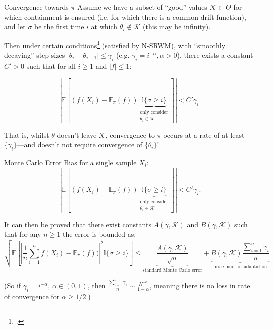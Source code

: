 \documentclass[aspectratio=169]{beamer}
\begin{document}
    



\begin{frame}{Convergence towards $\pi$}
    Assume we have a subset of ``good'' values $\mathcal{K} \subset \Theta$ for which containment is ensured (i.e. for which there is a common drift function), and let $\sigma$ be the first time $i$ at which $\theta_i \notin \mathcal{K}$ (this may be infinity).
    \pause

    Then under certain conditions\footcite{andrieu_ergodicity_2006} (satisfied by N-SRWM), with ``smoothly decaying'' step-sizes $|\theta_i - \theta_{i-1}| \leq \gamma_i$ (e.g. $\gamma_i = i^{-\alpha}, \alpha > 0$), there exists a constant $C' > 0$ such that for all $i \geq 1$ and $|f| \leq 1$:

    $$| \mathbb{E}[(f(X_i) - \mathbb{E}_\pi(f))\underbrace{\mathbb{I}\{\sigma \geq i\}}_{\substack{\text{only consider} \\ \text{$\theta_i \in \mathcal{K}$}}}]| < C' \gamma_i.$$

    \onslide<+-> 
    That is, whilst $\theta$ doesn't leave $\mathcal{K}$, convergence to $\pi$ occurs at a rate of at least $\{\gamma_i\}$---and doesn't not require convergence of $\{\theta_i\}$! 
\end{frame}

\begin{frame}{Monte Carlo Error}
    Bias for a single sample $X_i$:
    $$| \mathbb{E}[(f(X_i) - \mathbb{E}_\pi(f))\underbrace{\mathbb{I}\{\sigma \geq i\}}_{\substack{\text{only consider} \\ \text{$\theta_i \in \mathcal{K}$}}}]| < C' \gamma_i.$$
    
    \pause 

    It can then be proved that there exist constants $A(\gamma, \mathcal{K})$ and $B(\gamma, \mathcal{K})$ such that for any $n \geq 1$ the error is bounded as:
    $$\sqrt{\mathbb{E}\left[\left|\frac{1}{n} \sum_{i=1}^n f(X_i) - \mathbb{E}_\pi(f))\right|^2 \mathbb{I}\{\sigma \geq i\}\right]}
    \leq \underbrace{\frac{A(\gamma, \mathcal{K})}{\sqrt{n}}}_{\text{standard Monte Carlo error}} + \underbrace{B(\gamma, \mathcal{K}) \frac{\sum_{i=1}^n \gamma_i}{n}}_{\text{price paid for adaptation}}$$

    \pause
    (So if $\gamma_i = i^{-\alpha}$, $\alpha \in (0,1)$, then $\frac{\sum_{i=1}^n \gamma_i}{n} \sim \frac{N^{-\alpha}}{1-\alpha}$, meaning there is no loss in rate of convergence for $\alpha \geq 1/2$.)
\end{frame}
\end{document}
